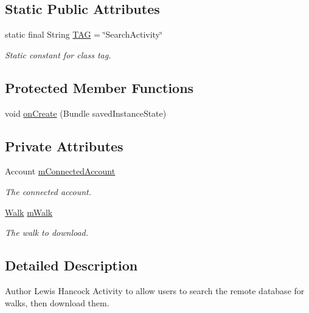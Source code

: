 \subsection*{Static Public Attributes}
\begin{DoxyCompactItemize}
\item 
static final String \hyperlink{classuk_1_1ac_1_1swan_1_1digitaltrails_1_1activities_1_1_search_activity_a0c23cfe7dac0b9b46a17a05a96073bd7}{T\+A\+G} = \char`\"{}Search\+Activity\char`\"{}
\begin{DoxyCompactList}\small\item\em Static constant for class tag. \end{DoxyCompactList}\end{DoxyCompactItemize}
\subsection*{Protected Member Functions}
\begin{DoxyCompactItemize}
\item 
void \hyperlink{classuk_1_1ac_1_1swan_1_1digitaltrails_1_1activities_1_1_search_activity_ae94b41e6188c812ae439aef057784b6f}{on\+Create} (Bundle saved\+Instance\+State)
\end{DoxyCompactItemize}
\subsection*{Private Attributes}
\begin{DoxyCompactItemize}
\item 
Account \hyperlink{classuk_1_1ac_1_1swan_1_1digitaltrails_1_1activities_1_1_search_activity_a5bc7671bdb5422daff1b40e5d610742f}{m\+Connected\+Account}
\begin{DoxyCompactList}\small\item\em The connected account. \end{DoxyCompactList}\item 
\hyperlink{classuk_1_1ac_1_1swan_1_1digitaltrails_1_1components_1_1_walk}{Walk} \hyperlink{classuk_1_1ac_1_1swan_1_1digitaltrails_1_1activities_1_1_search_activity_a82ce8c4a076d6d9e1cb5595034be7c6b}{m\+Walk}
\begin{DoxyCompactList}\small\item\em The walk to download. \end{DoxyCompactList}\end{DoxyCompactItemize}


\subsection{Detailed Description}
\begin{DoxyAuthor}{Author}
Lewis Hancock Activity to allow users to search the remote database for walks, then download them. 
\end{DoxyAuthor}


